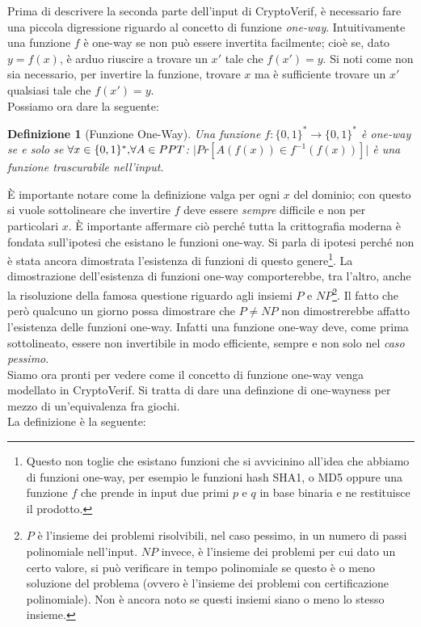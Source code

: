 \documentclass[a4paper,openright,twoside,12pt]{report}
\newtheorem{definizione}{Definizione}[chapter]
\begin{document}
Prima di descrivere la seconda parte dell'input di CryptoVerif, \`e necessario fare una piccola digressione riguardo al concetto di funzione \emph{one-way}.
Intuitivamente una funzione $f$ \`e one-way se non pu\`o essere invertita facilmente; cio\`e se, dato $y=f(x)$, \`e arduo riuscire a trovare un $x'$ tale che $f(x')=y$. 
Si noti come non sia necessario, per invertire la funzione, trovare $x$ ma \`e sufficiente trovare un $x'$ qualsiasi tale che $f(x')=y$.
\\Possiamo ora dare la seguente:
\begin{definizione}[Funzione One-Way]
Una funzione $f: \{0,1\}^*\rightarrow \{0,1\}^*$ \`e one-way se e solo se $\forall x \in  \{0,1\}^* \hbox{,} \forall A \in PPT$:  $\lvert Pr[A(f(x)) \in f^{-1}(f(x))]\rvert$ \`e una funzione 
trascurabile nell'input.
\end{definizione}

\`E importante notare come la definizione valga per ogni $x$ del dominio; con questo si vuole sottolineare che invertire $f$ deve essere \emph{sempre} difficile e non per particolari $x$.
\`E importante affermare ci\`o perch\'e tutta la crittografia moderna \`e fondata sull'ipotesi che esistano le funzioni one-way.
Si parla di ipotesi perch\'e non \`e stata ancora dimostrata l'esistenza di funzioni di questo genere\footnote{Questo non toglie
che esistano funzioni che si avvicinino all'idea che abbiamo di funzioni one-way, per esempio le funzioni hash SHA1, o MD5 oppure una funzione
$f$ che prende in input due primi $p$ e $q$ in base binaria e ne restituisce il prodotto.}.
La dimostrazione dell'esistenza di funzioni one-way comporterebbe, tra l'altro, anche la risoluzione della famosa questione riguardo agli insiemi
$P$ e $NP$\footnote{$P$ \`e l'insieme dei problemi risolvibili, nel caso pessimo, in un numero di passi polinomiale nell'input. $NP$ invece, \`e l'insieme dei problemi per cui dato un certo valore, 
si pu\`o verificare in tempo polinomiale se questo \`e o meno soluzione del problema (ovvero \`e l'insieme dei problemi con certificazione polinomiale). 
Non \`e ancora noto se questi insiemi siano o meno lo stesso insieme.}.
Il fatto che però qualcuno un giorno possa dimostrare che $P \neq NP$ non dimostrerebbe affatto l'esistenza delle funzioni one-way. 
Infatti una funzione one-way deve, come prima sottolineato, essere non invertibile in modo efficiente, sempre e non solo nel \emph{caso pessimo}. \\ 
Siamo ora pronti per vedere come il concetto di funzione one-way venga modellato in CryptoVerif.
Si tratta di dare una definzione di one-wayness per mezzo di un'equivalenza fra giochi.\\La definizione \`e la seguente:
\end{document}
